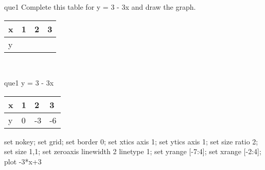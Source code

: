\documentclass[13.5pt, varwidth=true]{beamer}
\begin{document}
\begin{frame}[shrink=19,fragile]
	\begin{beamercolorbox}[rounded=true, left, shadow=true,wd=14.8cm]{que1}
		 Complete this table for y = 3 - 3x and draw the graph. \\[0.3cm] \renewcommand{\arraystretch}{1.2}\begin{tabular}{|C|C|C|C|} \hline x & 1 & 2 & 3 \\ \hline y & & & \\ \hline \end{tabular}\\[0.3cm]
	\end{beamercolorbox}
\end{frame}
\begin{frame}[shrink=19,fragile]
	\begin{beamercolorbox}[rounded=true, left, shadow=true,wd=14.8cm]{que1}
		y = 3 - 3x\renewcommand{\arraystretch}{1.2}\begin{tabular}{|C|C|C|C|} \hline x & 1 & 2 & 3 \\ \hline y & 0 & -3 & -6\\ \hline \end{tabular}\begin{gnuplot}[terminal=pdf] set nokey; set grid; set border 0; set xtics axis 1; set ytics axis 1; set size ratio 2; set size 1,1; set zeroaxis linewidth 2 linetype 1; set yrange [-7:4]; set xrange [-2:4]; plot -3*x+3 \end{gnuplot}
	\end{beamercolorbox}
\end{frame}
\end{document}
